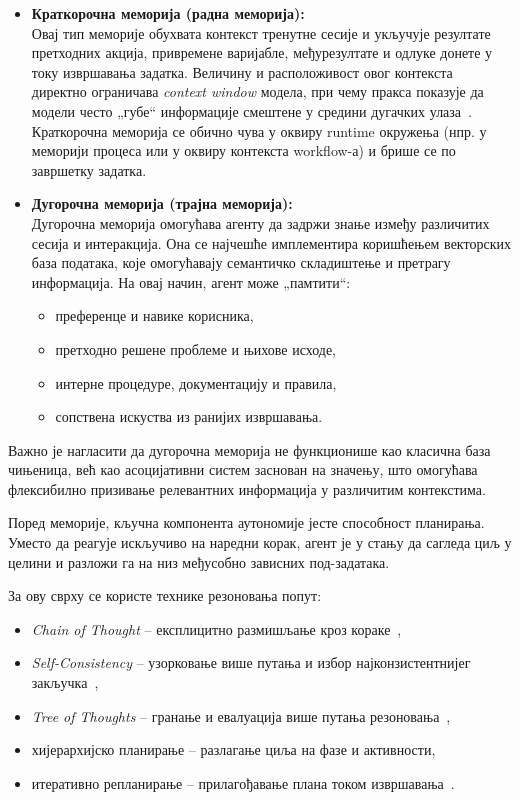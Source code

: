\begin{itemize}
    \item \textbf{Краткорочна меморија (радна меморија):} \\
    Овај тип меморије обухвата контекст тренутне сесије и
    укључује резултате претходних акција, привремене варијабле,
    међурезултате и одлуке донете у току извршавања задатка. Величину и расположивост овог контекста директно ограничава \textit{context window} модела, при чему пракса показује да модели често „губе“ информације смештене у средини дугачких улаза~\cite{liu2023lostmiddle}.
    Краткорочна меморија се обично чува у оквиру runtime окружења
    (нпр. у меморији процеса или у оквиру контекста workflow-а)
    и брише се по завршетку задатка.

    \item \textbf{Дугорочна меморија (трајна меморија):} \\
    Дугорочна меморија омогућава агенту да задржи знање између различитих сесија
    и интеракција. Она се најчешће имплементира коришћењем
    векторских база података, које омогућавају семантичко складиштење
    и претрагу информација. На овај начин, агент може „памтити“:
    \begin{itemize}
        \item преференце и навике корисника,
        \item претходно решене проблеме и њихове исходе,
        \item интерне процедуре, документацију и правила,
        \item сопствена искуства из ранијих извршавања.
    \end{itemize}
\end{itemize}
\noindent
Важно је нагласити да дугорочна меморија не функционише као класична база чињеница,
већ као асоцијативни систем заснован на значењу, што омогућава флексибилно
призивање релевантних информација у различитим контекстима.

Поред меморије, кључна компонента аутономије јесте способност планирања.
Уместо да реагује искључиво на наредни корак,
агент је у стању да сагледа циљ у целини
и разложи га на низ међусобно зависних под-задатака.

За ову сврху се користе технике резоновања попут:
\begin{itemize}
    \item \textit{Chain of Thought} – експлицитно размишљање кроз кораке~\cite{wei2022cot},
    \item \textit{Self-Consistency} – узорковање више путања и избор најконзистентнијег закључка~\cite{wang2022selfconsistency},
    \item \textit{Tree of Thoughts} – гранање и евалуација више путања резоновања~\cite{yao2023tot},
    \item хијерархијско планирање – разлагање циља на фазе и активности,
    \item итеративно репланирање – прилагођавање плана током извршавања~\cite{shinn2023reflexion,madaan2023selfrefine}.
\end{itemize}

